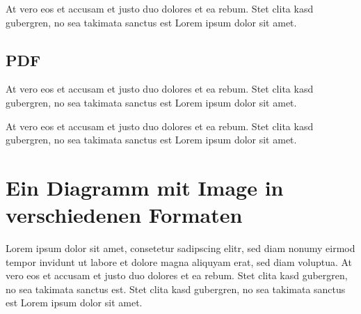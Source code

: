 \documentclass[11pt]{scrartcl}
\begin{document}
At vero eos et accusam et justo duo dolores et ea rebum. Stet clita kasd gubergren, no sea takimata sanctus est Lorem ipsum dolor sit amet.

\newpage

\subsection{PDF}

At vero eos et accusam et justo duo dolores et ea rebum. Stet clita kasd gubergren, no sea takimata sanctus est Lorem ipsum dolor sit amet.

\begin{figure}[htbp]
   \centering
   \setlength{\fboxsep}{5pt}
   \setlength{\fboxrule}{2pt}
   \label{fig:Abb-3-28-pdf}
\end{figure}

At vero eos et accusam et justo duo dolores et ea rebum. Stet clita kasd gubergren, no sea takimata sanctus est Lorem ipsum dolor sit amet.

\newpage

\section{Ein Diagramm mit Image in verschiedenen Formaten}

Lorem ipsum dolor sit amet, consetetur sadipscing elitr, sed diam nonumy eirmod tempor invidunt ut labore et dolore magna aliquyam erat, sed diam voluptua. At vero eos et accusam et justo duo dolores et ea rebum. Stet clita kasd gubergren, no sea takimata sanctus est. Stet clita kasd gubergren, no sea takimata sanctus est Lorem ipsum dolor sit amet.
\end{document}
